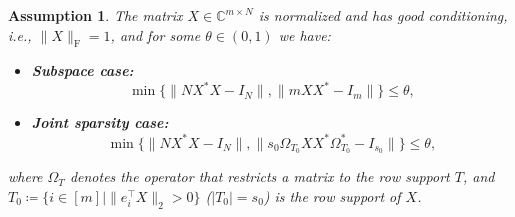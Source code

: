 \documentclass[11pt,journal]{IEEEtran}
\newcommand{\bbC}{\mathbb{C}}
\newcommand{\rmF}{\mathrm{F}}
\newcommand{\norm}[1]{\|{#1}\|}
\newcommand{\T}{\top}
\newtheorem{assumption}[theorem]{Assumption}
\begin{document}
\begin{assumption} \label{ass:X}
The matrix $X\in\bbC^{m\times N}$ is normalized and has good conditioning, i.e., $\norm{X}_\rmF = 1$, and for some $\theta \in (0,1)$ we have:
\begin{itemize}
	\item \textbf{Subspace case:}
	\[
	\min\{\norm{NX^*X-I_N}, \norm{mXX^*-I_m}\} \leq \theta,
	\]
	\item \textbf{Joint sparsity case:}
	\[
	\min\{\norm{NX^*X-I_N}, \norm{s_0\Omega_{T_0}XX^*\Omega_{T_0}^*-I_{s_0}}\} \leq \theta,
	\]
\end{itemize}
where $\Omega_T$ denotes the operator that restricts a matrix to the row support $T$, and $T_0 \coloneqq \{i\in[m] | \norm{e_i^\T X}_2 > 0 \}$ ($|T_0|=s_0$) is the row support of $X$. 
\end{assumption}
\end{document}
